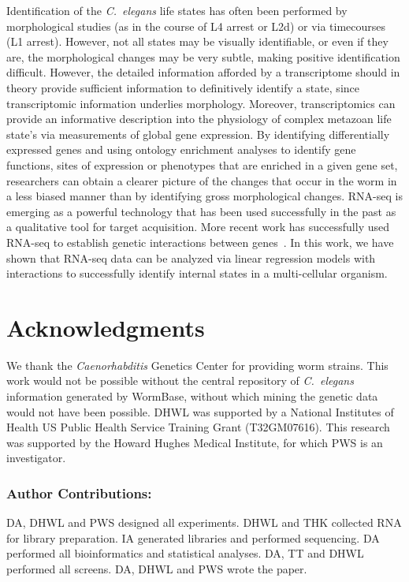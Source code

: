 \documentclass[10pt,letterpaper,twocolumn]{article}
\newcommand{\cel}{\emph{C.~elegans}}
\begin{document}
Identification of the \cel{} life states has often been performed by
morphological studies (as in the course of L4 arrest or L2d) or via
timecourses (L1 arrest). However, not all states may be visually identifiable,
or even if they are, the morphological changes may be very subtle, making
positive identification difficult. However, the detailed information afforded
by a transcriptome should in theory provide sufficient information to
definitively identify a state, since transcriptomic information underlies
morphology. Moreover, transcriptomics can provide an informative description
into the physiology of complex metazoan life state's via measurements of global
gene expression. By identifying differentially expressed genes and using
ontology enrichment analyses to identify gene functions, sites of expression
or phenotypes that are enriched in a given gene set, researchers can obtain a
clearer picture of the changes that occur in the worm in a less biased manner
than by identifying gross morphological changes.
RNA-seq is emerging as a powerful technology that has been used successfully in
the past as a qualitative tool for target acquisition. More recent work has
successfully used RNA-seq to establish genetic interactions between
genes~\cite{}. In this work, we have shown that RNA-seq data can be analyzed via
linear regression models with interactions to successfully identify internal
states in a multi-cellular organism. 

\section*{Acknowledgments}

We thank the \emph{Caenorhabditis} Genetics Center for providing worm strains.
This work would not be possible without the central repository of \cel{}
information generated by WormBase, without which mining the genetic data would
not have been possible. DHWL was supported by a National Institutes of Health
US Public Health Service Training Grant (T32GM07616). This research was
supported by the Howard Hughes Medical Institute, for which PWS is an
investigator.

\subsubsection*{Author Contributions:}
DA, DHWL and PWS designed all experiments. DHWL and THK collected RNA for
library preparation. IA generated libraries and performed sequencing.
DA performed all bioinformatics and statistical analyses.
DA, TT and DHWL performed all screens. DA, DHWL and PWS wrote the paper.

\nolinenumbers{}




\end{document}
